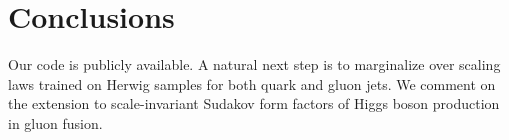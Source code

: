 \section{Conclusions}\label{sec:conclusions}

Our code is publicly available. A natural next step is to marginalize
over scaling laws trained on Herwig samples for both quark and gluon
jets. We comment on the extension to scale-invariant Sudakov form
factors of Higgs boson production in gluon fusion.

